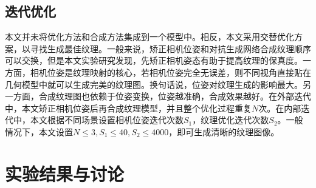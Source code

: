 \subsection{迭代优化}

本文并未将优化方法和合成方法集成到一个模型中。相反，本文采用交替优化方案，以寻找生成最佳纹理。一般来说，矫正相机位姿和对抗生成网络合成纹理顺序可以交换，但是本文实验研究发现，先矫正相机姿态有助于提高纹理的保真度。一方面，相机位姿是纹理映射的核心，若相机位姿完全无误差，则不同视角直接贴在几何模型中就可以生成完美的纹理图。换句话说，位姿对纹理生成的影响最大。另一方面，合成纹理图也依赖于位姿变换，位姿越准确，合成效果越好。在外部迭代中，本文矫正相机位姿后再合成纹理模型，并且整个优化过程重复$N$次。在内部迭代中，本文根据不同场景设置相机位姿迭代次数$S_1$，纹理优化迭代次数$S_2$。一般情况下，本文设置$N \le 3,S_1 \le 40,S_2 \le 4000$，即可生成清晰的纹理图像。

\section{实验结果与讨论}
